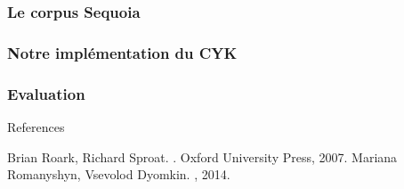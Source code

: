 \documentclass{beamer}
\begin{document}

\begin{frame}
  \frametitle{Le corpus Sequoia}

 
\end{frame}

\begin{frame}
\frametitle{Notre implémentation du CYK}

 
\end{frame}

\begin{frame}
\frametitle{Evaluation}

\end{frame}



\begin{frame}[allowframebreaks]{References}
  \begin{thebibliography}{10}    
  \beamertemplatebookbibitems
    Brian Roark, Richard Sproat.
    .
    \newblock Oxford University Press, 2007.
  \beamertemplatearticlebibitems
    Mariana Romanyshyn, Vsevolod Dyomkin.
    , 2014.
    
  \end{thebibliography}
\end{frame}
\end{document}
